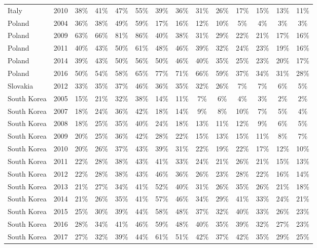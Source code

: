\begin{ThreePartTable}
\begin{longtable}[t]{lccccccccccccc}
Italy & 2010 & 38\% & 41\% & 47\% & 55\% & 39\% & 36\% & 31\% & 26\% & 17\% & 15\% & 13\% & 11\%\\
\addlinespace
Poland & 2004 & 36\% & 38\% & 49\% & 59\% & 17\% & 16\% & 12\% & 10\% & 5\% & 4\% & 3\% & 3\%\\
Poland & 2009 & 63\% & 66\% & 81\% & 86\% & 40\% & 38\% & 31\% & 29\% & 22\% & 21\% & 17\% & 16\%\\
Poland & 2011 & 40\% & 43\% & 50\% & 61\% & 48\% & 46\% & 39\% & 32\% & 24\% & 23\% & 19\% & 16\%\\
Poland & 2014 & 39\% & 43\% & 50\% & 56\% & 50\% & 46\% & 40\% & 35\% & 25\% & 23\% & 20\% & 17\%\\
Poland & 2016 & 50\% & 54\% & 58\% & 65\% & 77\% & 71\% & 66\% & 59\% & 37\% & 34\% & 31\% & 28\%\\
\addlinespace
Slovakia & 2012 & 33\% & 35\% & 37\% & 46\% & 36\% & 35\% & 32\% & 26\% & 7\% & 7\% & 6\% & 5\%\\
\addlinespace
South Korea & 2005 & 15\% & 21\% & 32\% & 38\% & 14\% & 11\% & 7\% & 6\% & 4\% & 3\% & 2\% & 2\%\\
South Korea & 2007 & 18\% & 24\% & 36\% & 42\% & 18\% & 14\% & 9\% & 8\% & 10\% & 7\% & 5\% & 4\%\\
South Korea & 2008 & 18\% & 25\% & 35\% & 40\% & 24\% & 18\% & 13\% & 11\% & 12\% & 9\% & 6\% & 5\%\\
South Korea & 2009 & 20\% & 25\% & 36\% & 42\% & 28\% & 22\% & 15\% & 13\% & 15\% & 11\% & 8\% & 7\%\\
South Korea & 2010 & 20\% & 26\% & 37\% & 43\% & 39\% & 31\% & 22\% & 19\% & 22\% & 17\% & 12\% & 10\%\\
South Korea & 2011 & 22\% & 28\% & 38\% & 43\% & 41\% & 33\% & 24\% & 21\% & 26\% & 21\% & 15\% & 13\%\\
South Korea & 2012 & 22\% & 28\% & 38\% & 43\% & 46\% & 36\% & 26\% & 23\% & 28\% & 22\% & 16\% & 14\%\\
South Korea & 2013 & 21\% & 27\% & 34\% & 41\% & 52\% & 40\% & 31\% & 26\% & 35\% & 26\% & 21\% & 18\%\\
South Korea & 2014 & 21\% & 26\% & 35\% & 41\% & 57\% & 46\% & 34\% & 29\% & 41\% & 33\% & 24\% & 21\%\\
South Korea & 2015 & 25\% & 30\% & 39\% & 44\% & 58\% & 48\% & 37\% & 32\% & 40\% & 33\% & 26\% & 23\%\\
South Korea & 2016 & 28\% & 34\% & 41\% & 46\% & 59\% & 48\% & 40\% & 35\% & 39\% & 32\% & 27\% & 23\%\\
South Korea & 2017 & 27\% & 32\% & 39\% & 44\% & 61\% & 51\% & 42\% & 37\% & 42\% & 35\% & 29\% & 25\%\\

\end{longtable}
\end{ThreePartTable}

